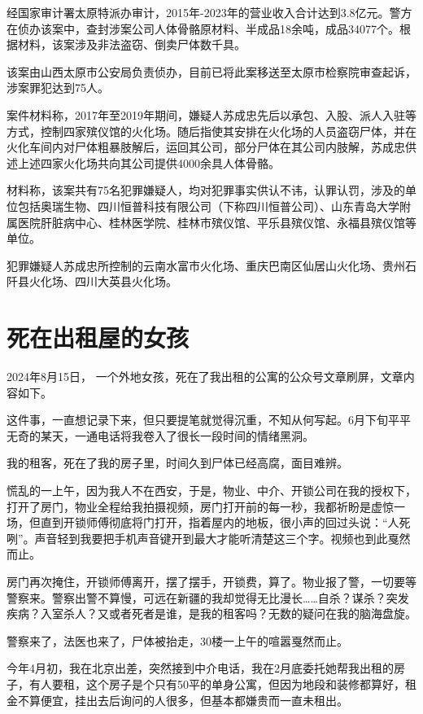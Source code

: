 经国家审计署太原特派办审计，2015年-2023年的营业收入合计达到3.8亿元。警方在侦办该案中，查封涉案公司人体骨骼原材料、半成品18余吨，成品34077个。根据材料，该案涉及非法盗窃、倒卖尸体数千具。

该案由山西太原市公安局负责侦办，目前已将此案移送至太原市检察院审查起诉，涉案罪犯达到75人。

案件材料称，2017年至2019年期间，嫌疑人苏成忠先后以承包、入股、派人入驻等方式，控制四家殡仪馆的火化场。随后指使其安排在火化场的人员盗窃尸体，并在火化车间内对尸体粗暴肢解后，运回其公司，部分尸体在其公司内肢解，苏成忠供述上述四家火化场共向其公司提供4000余具人体骨骼。

材料称，该案共有75名犯罪嫌疑人，均对犯罪事实供认不讳，认罪认罚，涉及的单位包括奥瑞生物、四川恒普科技有限公司（下称四川恒普公司）、山东青岛大学附属医院肝脏病中心、桂林医学院、桂林市殡仪馆、平乐县殡仪馆、永福县殡仪馆等单位。

犯罪嫌疑人苏成忠所控制的云南水富市火化场、重庆巴南区仙居山火化场、贵州石阡县火化场、四川大英县火化场。

\section{死在出租屋的女孩}

2024年8月15日， 一个外地女孩，死在了我出租的公寓的公众号文章刷屏，文章内容如下。

这件事，一直想记录下来，但只要提笔就觉得沉重，不知从何写起。6月下旬平平无奇的某天，一通电话将我卷入了很长一段时间的情绪黑洞。

我的租客，死在了我的房子里，时间久到尸体已经高腐，面目难辨。

慌乱的一上午，因为我人不在西安，于是，物业、中介、开锁公司在我的授权下，打开了房门，物业全程给我拍摄视频，房门打开前的每一秒，我都祈盼是虚惊一场，但直到开锁师傅彻底将门打开，指着屋内的地板，很小声的回过头说：“人死咧”。声音轻到我要把手机声音键开到最大才能听清楚这三个字。视频也到此戛然而止。

房门再次掩住，开锁师傅离开，摆了摆手，开锁费，算了。物业报了警，一切要等警察来。警察出警不算慢，可远在新疆的我却觉得无比漫长……自杀？谋杀？突发疾病？入室杀人？又或者死者是谁，是我的租客吗？无数的疑问在我的脑海盘旋。

警察来了，法医也来了，尸体被抬走，30楼一上午的喧嚣戛然而止。

今年4月初，我在北京出差，突然接到中介电话，我在2月底委托她帮我出租的房子，有人要租，这个房子是个只有50平的单身公寓，但因为地段和装修都算好，租金不算便宜，挂出去后询问的人很多，但基本都嫌贵而一直未租出。

